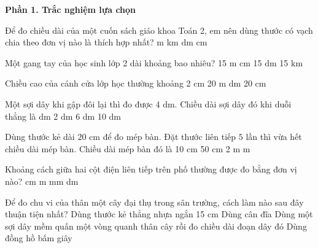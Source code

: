\textbf{Phần 1. Trắc nghiệm lựa chọn}

\begin{ex} %
Để đo chiều dài của một cuốn sách giáo khoa Toán 2, em nên dùng thước có vạch chia theo đơn vị nào là thích hợp nhất?
\choice
{m}
{km}
{dm}
{\True cm}
\end{ex}

\begin{ex} %
Một gang tay của học sinh lớp 2 dài khoảng bao nhiêu?
\choice
{15 m}
{ cm}
{15 dm}
{15 km}
\end{ex}

\begin{ex} %
Chiều cao của cánh cửa lớp học thường khoảng
\choice
{2 cm}
{20 m}
{ dm}
{20 cm}
\end{ex}

\begin{ex} %
Một sợi dây khi gập đôi lại thì đo được $4\text{ dm}$. Chiều dài sợi dây đó khi duỗi thẳng là
\choice
{ dm}
{2 dm}
{6 dm}
{10 dm}
\end{ex}

\begin{ex} %
Dùng thước kẻ dài $20\text{ cm}$ để đo mép bàn. Đặt thước liên tiếp $5$ lần thì vừa hết chiều dài mép bàn. Chiều dài mép bàn đó là
\choice
{10 cm}
{50 cm}
{2 m}
{ m}
\end{ex}

\begin{ex} %
Khoảng cách giữa hai cột điện liên tiếp trên phố thường được đo bằng đơn vị nào?
\choice
{cm}
{\True m}
{mm}
{dm}
\end{ex}

\begin{ex} %
Để đo chu vi của thân một cây đại thụ trong sân trường, cách làm nào sau đây thuận tiện nhất?
\choice
{Dùng thước kẻ thẳng nhựa ngắn 15 cm}
{Dùng cân đĩa}
{\True Dùng một sợi dây mềm quấn một vòng quanh thân cây rồi đo chiều dài đoạn dây đó}
{Dùng đồng hồ bấm giây}
\end{ex}

